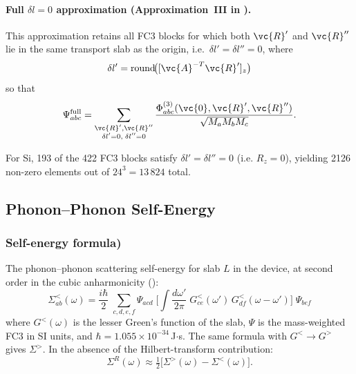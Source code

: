 \paragraph{Full $\delta l = 0$ approximation (Approximation~III in \cite{guo_quantum_2020}).}
This approximation retains all FC3 blocks for which
both $\vc{R}'$ and $\vc{R}''$ lie in the same transport slab as the
origin, i.e.\ $\delta l' = \delta l'' = 0$, where
\begin{equation}
    \delta l' = \mathrm{round}\!\bigl([\vc{A}^{-T}\vc{R}']_z\bigr)
\end{equation}
so that
\begin{equation}\label{eq:fc3_full}
    \Psi_{abc}^\mathrm{full}
    = \sum_{\substack{\vc{R}',\vc{R}'' \\ \delta l'=0,\;\delta l''=0}}
      \frac{\Phi^{(3)}_{abc}(\vc{0}, \vc{R}', \vc{R}'')}
           {\sqrt{M_a M_b M_c}}.
\end{equation}

For Si, 193 of the 422 FC3 blocks satisfy $\delta l' = \delta l'' = 0$ (i.e. $R_z = 0$),
yielding 2126 non-zero elements out of $24^3 = 13\,824$ total.

\subsection{Phonon--Phonon Self-Energy}
\label{sec:self_energy}

\subsubsection{Self-energy formula)}

The phonon--phonon scattering self-energy for slab $L$ in the device,
at second order in the cubic anharmonicity (\cite[Eq. 8]{guo_quantum_2020}):
\begin{equation}\label{eq:sigma_guo}
  \Sigma^{<}_{ab}(\omega)
  = \frac{i\hbar}{2}\;
    \sum_{c,d,e,f} \Psi_{acd}\;
    \biggl[\int \frac{d\omega'}{2\pi}\;
      G^{<}_{ce}(\omega')\,G^{<}_{df}(\omega - \omega')
    \biggr]\;\Psi_{bef}
\end{equation}
where $G^<(\omega)$ is the lesser Green's function of the slab,
$\Psi$ is the mass-weighted FC3 in SI units, and $\hbar = 1.055\times
10^{-34}$\,J$\cdot$s.  The same formula with $G^<\to G^>$ gives
$\Sigma^>$.  In the absence of the Hilbert-transform contribution:
\begin{equation}\label{eq:sigma_r}
  \Sigma^R(\omega) \approx \tfrac{1}{2}
    \bigl[\Sigma^>(\omega) - \Sigma^<(\omega)\bigr].
\end{equation}

